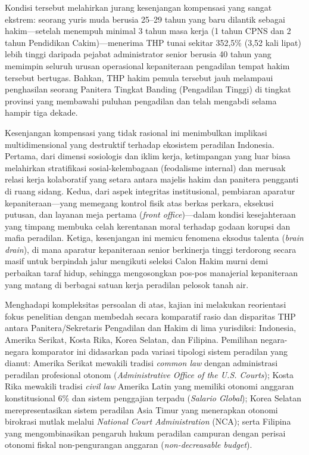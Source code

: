 \documentclass[12pt, a4paper]{article}
\begin{document}
Kondisi tersebut melahirkan jurang kesenjangan kompensasi yang sangat ekstrem: seorang yuris muda berusia 25--29 tahun yang baru dilantik sebagai hakim---setelah menempuh minimal 3 tahun masa kerja (1 tahun CPNS dan 2 tahun Pendidikan Cakim)---menerima THP tunai sekitar 352,5\% (3,52 kali lipat) lebih tinggi daripada pejabat administrator senior berusia 40 tahun yang memimpin seluruh urusan operasional kepaniteraan pengadilan tempat hakim tersebut bertugas. Bahkan, THP hakim pemula tersebut jauh melampaui penghasilan seorang Panitera Tingkat Banding (Pengadilan Tinggi) di tingkat provinsi yang membawahi puluhan pengadilan dan telah mengabdi selama hampir tiga dekade.

Kesenjangan kompensasi yang tidak rasional ini menimbulkan implikasi multidimensional yang destruktif terhadap ekosistem peradilan Indonesia. Pertama, dari dimensi sosiologis dan iklim kerja, ketimpangan yang luar biasa melahirkan stratifikasi sosial-kelembagaan (feodalisme internal) dan merusak relasi kerja kolaboratif yang setara antara majelis hakim dan panitera pengganti di ruang sidang. Kedua, dari aspek integritas institusional, pembiaran aparatur kepaniteraan---yang memegang kontrol fisik atas berkas perkara, eksekusi putusan, dan layanan meja pertama (\textit{front office})---dalam kondisi kesejahteraan yang timpang membuka celah kerentanan moral terhadap godaan korupsi dan mafia peradilan. Ketiga, kesenjangan ini memicu fenomena eksodus talenta (\textit{brain drain}), di mana aparatur kepaniteraan senior berkinerja tinggi terdorong secara masif untuk berpindah jalur mengikuti seleksi Calon Hakim murni demi perbaikan taraf hidup, sehingga mengosongkan pos-pos manajerial kepaniteraan yang matang di berbagai satuan kerja peradilan pelosok tanah air.

Menghadapi kompleksitas persoalan di atas, kajian ini melakukan reorientasi fokus penelitian dengan membedah secara komparatif rasio dan disparitas THP antara Panitera/Sekretaris Pengadilan dan Hakim di lima yurisdiksi: Indonesia, Amerika Serikat, Kosta Rika, Korea Selatan, dan Filipina. Pemilihan negara-negara komparator ini didasarkan pada variasi tipologi sistem peradilan yang dianut: Amerika Serikat mewakili tradisi \textit{common law} dengan administrasi peradilan profesional otonom (\textit{Administrative Office of the U.S. Courts}); Kosta Rika mewakili tradisi \textit{civil law} Amerika Latin yang memiliki otonomi anggaran konstitusional 6\% dan sistem penggajian terpadu (\textit{Salario Global}); Korea Selatan merepresentasikan sistem peradilan Asia Timur yang menerapkan otonomi birokrasi mutlak melalui \textit{National Court Administration} (NCA); serta Filipina yang mengombinasikan pengaruh hukum peradilan campuran dengan perisai otonomi fiskal non-pengurangan anggaran (\textit{non-decreasable budget}).
\end{document}
